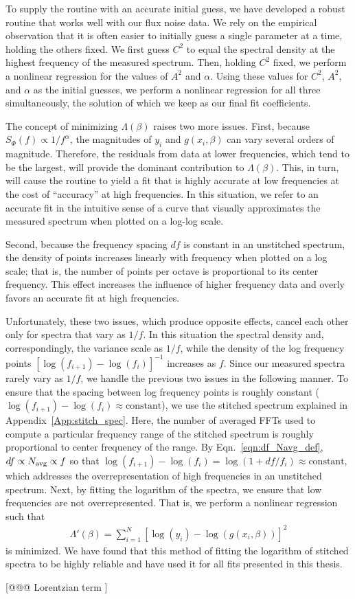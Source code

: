 To supply the routine with an accurate initial guess, we have developed a robust routine that works well with our flux noise data. We rely on the empirical observation that it is often easier to initially guess a single parameter at a time, holding the others fixed. We first guess $C^2$ to equal the spectral density at the highest frequency of the measured spectrum. Then, holding $C^2$ fixed, we perform a nonlinear regression for the values of $A^2$ and $\alpha$. Using these values for $C^2$, $A^2$, and $\alpha$ as the initial guesses, we perform a nonlinear regression for all three simultaneously, the solution of which we keep as our final fit coefficients.

The concept of minimizing $\Lambda(\beta)$ raises two more issues. First, because $S_\Phi(f) \propto 1/f^\alpha$, the magnitudes of $y_i$ and $g(x_i,\beta)$ can vary several orders of magnitude. Therefore, the residuals from data at lower frequencies, which tend to be the largest, will provide the dominant contribution to $\Lambda(\beta)$. This, in turn, will cause the routine to yield a fit that is highly accurate at low frequencies at the cost of ``accuracy'' at high frequencies. In this situation, we refer to an accurate fit in the intuitive sense of a curve that visually approximates the measured spectrum when plotted on a log-log scale. 

Second, because the frequency spacing $df$ is constant in an unstitched spectrum, the density of points increases linearly with frequency when plotted on a log scale; that is, the number of points per octave is proportional to its center frequency. This effect increases the influence of higher frequency data and overly favors an accurate fit at high frequencies.

Unfortunately, these two issues, which produce opposite effects, cancel each other only for spectra that vary as $1/f$. In this situation the spectral density and, correspondingly, the variance scale as $1/f$, while the density of the log frequency points $[\log(f_{i+1}) - \log(f_i)]^{-1}$ increases as $f$. Since our measured spectra rarely vary as $1/f$, we handle the previous two issues in the following manner. To ensure that the spacing between log frequency points is roughly constant ($\log(f_{i+1}) - \log(f_i) \approx \text{constant}$), we use the stitched spectrum explained in Appendix~\ref{App:stitch_spec}. Here, the number of averaged FFTs used to compute a particular frequency range of the stitched spectrum is roughly proportional to center frequency of the range. By Eqn.~\eqref{eqn:df_Navg_def}, $df \propto N_\text{avg}{} \propto f$ so that $\log(f_{i+1}) - \log(f_i) = \log(1 + df/f_i) \approx \text{constant}$, which addresses the overrepresentation of high frequencies in an unstitched spectrum. Next, by fitting the logarithm of the spectra, we ensure that low frequencies are not overrepresented. That is, we perform a nonlinear regression such that
\begin{align}\label{eqn:sum_squared_residuals_log}
\Lambda'(\beta) = \sum_{i=1}^N [\log(y_i) - \log(g(x_i,\beta))]^2
\end{align}
is minimized. We have found that this method of fitting the logarithm of stitched spectra to be highly reliable and have used it for all fits presented in this thesis.

[@@@ Lorentzian term ]